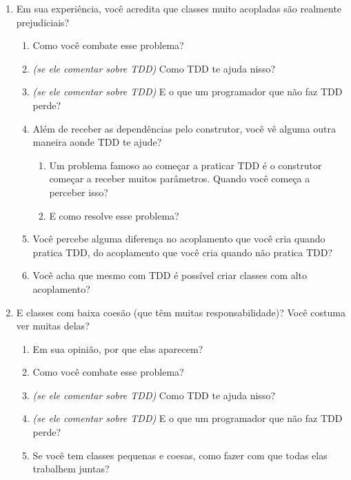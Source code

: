 \begin{enumerate}
	\item{Em sua experiência, você acredita que classes muito acopladas são realmente prejudiciais?}
		\begin{enumerate}
			\item Como você combate esse problema?

			\item \textit{(se ele comentar sobre TDD)} Como TDD te ajuda nisso?

			\item \textit{(se ele comentar sobre TDD)} E o que um programador que não faz
			TDD perde?
			
			\item Além de receber as dependências pelo construtor, você vê alguma outra
			maneira aonde TDD te ajude?
				\begin{enumerate}
					\item Um problema famoso ao começar a praticar TDD é o construtor começar a
					receber muitos parâmetros. Quando você começa a perceber isso?
					\item E como resolve esse problema?
				\end{enumerate}

			\item Você percebe alguma diferença no acoplamento que você cria quando
			pratica TDD, do acoplamento que você cria quando não pratica TDD?

			\item Você acha que mesmo com TDD é possível criar classes com alto acoplamento? 
		\end{enumerate}

	\item{E classes com baixa coesão (que têm muitas responsabilidade)? Você
	costuma ver muitas delas?}
		\begin{enumerate}
			\item Em sua opinião, por que elas aparecem?

			\item Como você combate esse problema?

			\item \textit{(se ele comentar sobre TDD)} Como TDD te ajuda nisso?
			
			\item \textit{(se ele comentar sobre TDD)} E o que um programador que não faz TDD
			perde?

			\item Se você tem classes pequenas e coesas, como fazer com que todas elas
			trabalhem juntas?
		\end{enumerate}


\end{enumerate}
